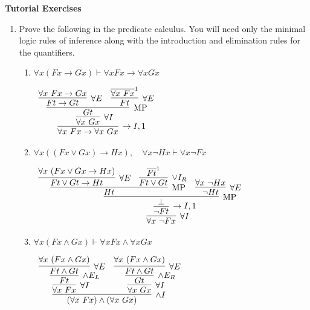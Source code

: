 \documentclass[11pt]{report}
\newcommand{\temp}[2]{{\overline{#2}}^{#1}}
\begin{document}
\newpage
{\bf Tutorial Exercises}
\begin{enumerate}
	
	\item Prove the following in the predicate calculus. You will need only the minimal logic rules of inference along with the introduction and elimination rules for the quantifiers.  

		\begin{enumerate}
			\item $\forall x (Fx \to Gx) \vdash  \forall x Fx \to \forall x Gx$
			
			\begin{center}
				$\begin{array}{c}
					\infer[\to I, 1]{\forall x \ Fx \to \forall x \ Gx}
						{\infer[\forall I]{\forall x \ Gx}
						{\infer[\MP]{Gt}
							{\infer[\forall E]{Ft \to Gt}
								{\forall x \ Fx \to Gx}
							&
							\infer[\forall E]{Ft}
								{\temp{1}{\forall x \ Fx}}}}}
				\end{array}$
			\end{center}
			
			\item $\forall x ((Fx \lor Gx) \to Hx),\quad \forall x \neg Hx \vdash  \forall x \neg Fx$
			
			\begin{center}
				$\begin{array}{c}
					\infer[\forall I]{\forall x \ \lnot Fx}
						{\infer[\to I,1]{\lnot Ft}
							{\infer[\MP]{\bot}
								{\infer[\MP]{Ht}
									{\infer[\forall E]{Ft \lor Gt \to Ht}
										{\forall x \ (Fx \lor Gx \to Hx)}
									&
									\infer[\lor I_{R}]{Ft \lor Gt}
										{\temp{1}{Ft}}}
								&
								\infer[\forall E]{\lnot Ht}
									{\forall x \ \lnot Hx}}}}
				\end{array}$
			\end{center}
			
			\item $\forall x (Fx\land Gx) \vdash  \forall x Fx\land \forall x Gx$
			
			\begin{center}
				$\begin{array}{c}
					\infer[\land I]{(\forall x \ Fx) \land (\forall x \ Gx)}
						{\infer[\forall I]{\forall x \ Fx}
							{\infer[\land E_{L}]{Ft}
								{\infer[\forall E]{Ft \land Gt}
									{\forall x \ (Fx \land Gx)}}}
						&
						\infer[\forall I]{\forall x \ Gx}
							{\infer[\land E_{R}]{Gt}
								{\infer[\forall E]{Ft \land Gt}
									{\forall x \ (Fx \land Gx)}}}}
				\end{array}$
			\end{center}
			

\end{enumerate}
\end{enumerate}
\end{document}
